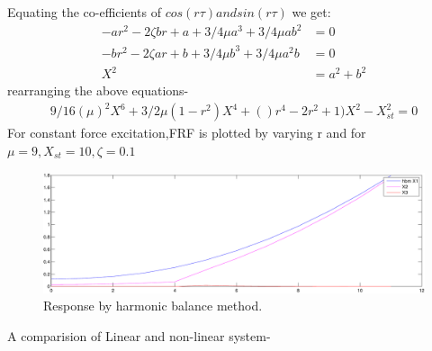 Equating the co-efficients of $cos(r \tau) and sin(r \tau)$ we get:
\begin{align}
-ar^2-2\zeta br+a+ 3/4\mu a^3+3/4\mu ab^2&=0 \\
-br^2-2\zeta ar+b+ 3/4\mu b^3+3/4\mu a^2b&=0\\
X^2&=a^2+b^2
\end{align}
rearranging the above equations-
\begin{align}
9/16(\mu )^2X^6+3/2\mu (1-r^2)X^4+()r^4-2r^2+1)X^2-X_{st}^2=0
\end{align}
For constant force excitation,FRF is plotted by varying r and for $\mu =9 , X_{st}=10 ,\zeta=0.1 $
\begin{figure}[h!]
\includegraphics[width=\textwidth,height=0.5\textwidth]{"figures/hbm"}
\caption{Response by harmonic balance method.}
  \label{fig:hbm}
\end{figure}
A comparision of Linear and non-linear system-

